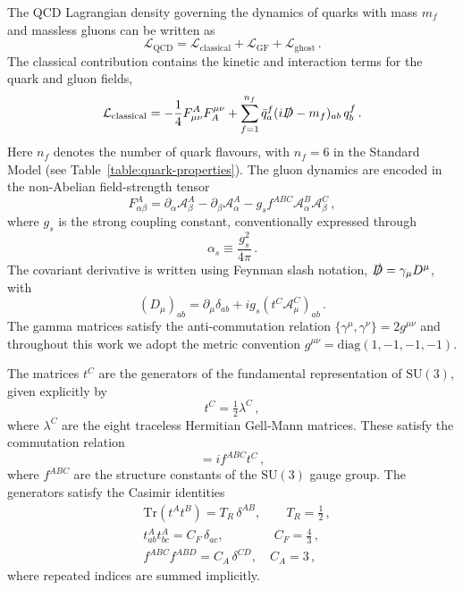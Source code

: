  The QCD Lagrangian density governing the dynamics of quarks with mass $m_f$ 
 and massless gluons can be written as
\begin{equation}
\label{eq: L-QCD}
\mathcal{L}_{\mathrm{QCD}}
= \mathcal{L}_{\mathrm{classical}}
+ \mathcal{L}_{\mathrm{GF}}
+ \mathcal{L}_{\mathrm{ghost}}\,.
\end{equation}
The classical contribution contains the kinetic and interaction terms 
for the quark and gluon fields,
\begin{equation}
\label{eq: L-Classical}
\mathcal{L}_{\mathrm{classical}}
= -\frac{1}{4} F_{\mu\nu}^{A} F^{\mu\nu}_{A}
+ \sum_{f=1}^{n_f} \bar{q}^f_a (i\slashed{D} - m_f)_{ab}\, q^f_b \,.
\end{equation}
Here $n_f$ denotes the number of quark flavours, with $n_f = 6$ in the Standard Model 
(see Table~\ref{table:quark-properties}). The gluon dynamics are encoded in the non-Abelian field-strength tensor
\begin{equation}
\label{eq:F-alpha-beta}
F_{\alpha\beta}^{A}
= \partial_\alpha \mathcal{A}_\beta^A
- \partial_\beta \mathcal{A}_\alpha^A
- g_s f^{ABC} \mathcal{A}_\alpha^B \mathcal{A}_\beta^C \,,
\end{equation}
where $g_s$ is the strong coupling constant, conventionally expressed through
\begin{equation}
    \alpha_s \equiv \frac{g_s^2}{4\pi}\,.
    \label{eq:coupling-constant}
\end{equation}
The covariant derivative is written using Feynman slash notation, $\slashed{D} = \gamma_\mu D^\mu$, with
\begin{equation}
(D_\mu)_{ab}
= \partial_\mu \delta_{ab}
+ ig_s (t^C \mathcal{A}_\mu^C)_{ab}\,.
\end{equation}
The gamma matrices satisfy the anti-commutation relation $\{\gamma^\mu,\gamma^\nu\} = 2 g^{\mu\nu}$
and throughout this work we adopt the metric convention $g^{\mu\nu} = \mathrm{diag}(1,-1,-1,-1)$.

The matrices $t^C$ are the generators of the fundamental representation of $\mathrm{SU}(3)$, 
given explicitly by 
\begin{equation}
	t^C = \tfrac{1}{2}\lambda^C\,,
\end{equation}
where $\lambda^C$ are the eight traceless Hermitian Gell-Mann matrices. 
These satisfy the commutation relation
\begin{equation}
[t^A, t^B] = i f^{ABC} t^C\,,
\end{equation}
where $f^{ABC}$ are the structure constants of the $\mathrm{SU}(3)$ gauge group.
The generators satisfy the Casimir identities
\begin{equation}
\begin{aligned}
&\mathrm{Tr}(t^A t^B) = T_R\, \delta^{AB}, \qquad T_R = \tfrac{1}{2}\,, \\[1ex]
&t^{A}_{ab} t^{A}_{bc} = C_F\, \delta_{ac}, \qquad \qquad C_F = \tfrac{4}{3}\,, \\[1ex]
&f^{ABC} f^{ABD} = C_A\, \delta^{CD}, \quad C_A = 3\,,
\end{aligned}
\end{equation}
where repeated indices are summed implicitly.

